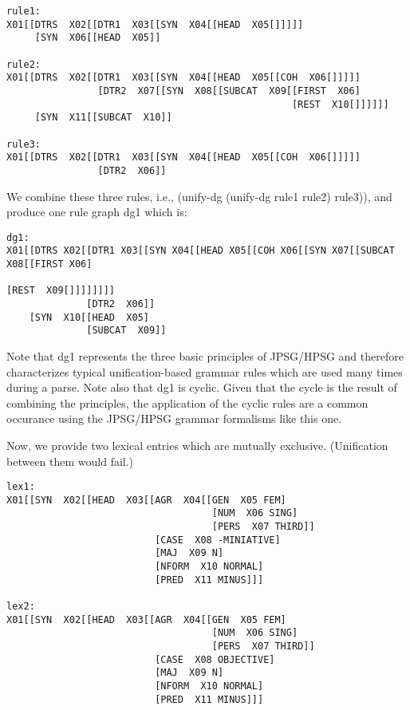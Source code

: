 \begin{footnotesize}
\begin{verbatim}
rule1:
X01[[DTRS  X02[[DTR1  X03[[SYN  X04[[HEAD  X05[]]]]]
     [SYN  X06[[HEAD  X05]] 

rule2:
X01[[DTRS  X02[[DTR1  X03[[SYN  X04[[HEAD  X05[[COH  X06[]]]]]
                [DTR2  X07[[SYN  X08[[SUBCAT  X09[[FIRST  X06]
                                                  [REST  X10[]]]]]]
     [SYN  X11[[SUBCAT  X10]] 

rule3:
X01[[DTRS  X02[[DTR1  X03[[SYN  X04[[HEAD  X05[[COH  X06[]]]]]
                [DTR2  X06]] 
\end{verbatim}
\end{footnotesize}
We combine these three rules, i.e., (unify-dg (unify-dg
rule1 rule2) rule3)), and produce one rule graph dg1 which
is:

\begin{footnotesize}
\begin{verbatim}
dg1:
X01[[DTRS X02[[DTR1 X03[[SYN X04[[HEAD X05[[COH X06[[SYN X07[[SUBCAT X08[[FIRST X06]
                                                                         [REST  X09[]]]]]]]]
              [DTR2  X06]]
    [SYN  X10[[HEAD  X05]
              [SUBCAT  X09]] 
\end{verbatim}
\end{footnotesize}

Note that dg1 represents the three basic principles of
JPSG/HPSG and therefore characterizes typical
unification-based grammar rules which are used many times
during a parse. Note also that dg1 is cyclic. Given that the
cycle is the result of combining the principles, the
application of the cyclic rules are a common occurance using
the JPSG/HPSG grammar formalisms like this one.

Now, we provide two lexical entries which are mutually
exclusive. (Unification between them would fail.)


\begin{footnotesize}
\begin{verbatim}
lex1:
X01[[SYN  X02[[HEAD  X03[[AGR  X04[[GEN  X05 FEM]
                                    [NUM  X06 SING]
                                    [PERS  X07 THIRD]]
                          [CASE  X08 -MINIATIVE]
                          [MAJ  X09 N]
                          [NFORM  X10 NORMAL]
                          [PRED  X11 MINUS]]] 

lex2:
X01[[SYN  X02[[HEAD  X03[[AGR  X04[[GEN  X05 FEM]
                                    [NUM  X06 SING]
                                    [PERS  X07 THIRD]]
                          [CASE  X08 OBJECTIVE]
                          [MAJ  X09 N]
                          [NFORM  X10 NORMAL]
                          [PRED  X11 MINUS]]] 
\end{verbatim}
\end{footnotesize}

